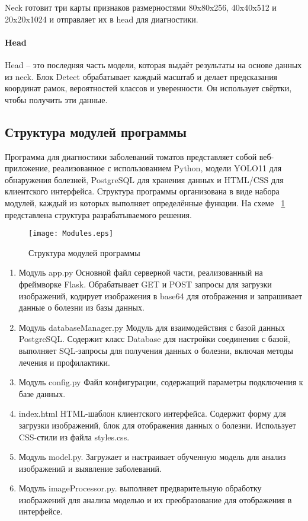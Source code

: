 Neck готовит три карты признаков размерностями 80x80x256, 40x40x512 и 20x20x1024 и отправляет их в head для диагностики.

\paragraph{Head}

Head -- это последняя часть модели, которая выдаёт результаты на основе данных из neck. Блок Detect обрабатывает каждый масштаб и делает предсказания координат рамок, вероятностей классов и уверенности. Он использует свёртки, чтобы получить эти данные.

\subsection{Структура модулей программы}

Программа для диагностики заболеваний томатов представляет собой веб-приложение, реализованное с использованием Python, модели YOLO11 для обнаружения болезней, PostgreSQL для хранения данных и HTML/CSS для клиентского интерфейса. Структура программы организована в виде набора модулей, каждый из которых выполняет определённые функции. На схеме ~\ref{модули:image} представлена структура разрабатываемого решения.
	\begin{figure}[H]
		\texttt{[image: Modules.eps]}
		\caption{Структура модулей программы}
		\label{модули:image}
	\end{figure}

\begin{enumerate}
	\item Модуль app.py 
	Основной файл серверной части, реализованный на фреймворке Flask. Обрабатывает GET и POST запросы для загрузки изображений, кодирует изображения в base64 для отображения и запрашивает данные о болезни из базы данных.
	
	\item Модуль databaseManager.py
	Модуль для взаимодействия с базой данных PostgreSQL. Содержит класс Database для настройки соединения с базой, выполняет SQL-запросы для получения данных о болезни, включая методы лечения и профилактики.
	
	\item Модуль config.py
	Файл конфигурации, содержащий параметры подключения к базе данных.
	
	\item index.html
	HTML-шаблон клиентского интерфейса. Содержит форму для загрузки изображений, блок для отображения данных о болезни. Использует CSS-стили из файла styles.css.
	
	\item Модуль model.py. Загружает и настраивает обученную модель для анализ изображений и выявление заболеваний.
	
	\item Модуль imageProcessor.py. выполняет предварительную обработку изображений для анализа моделью и их преобразование для отображения в интерфейсе.
	
\end{enumerate}

